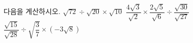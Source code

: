 다음을 계산하시오.
 $\sqrt{72}\div\sqrt{20}\times\sqrt{10}$
 $\dfrac{4\sqrt{3}}{\sqrt{2}}\times\dfrac{2\sqrt{5}}{\sqrt{6}}\div\dfrac{\sqrt{30}}{\sqrt{27}}$
 $\dfrac{\sqrt{15}}{\sqrt{28}}\div\sqrt{\dfrac{3}{7}}\times(-3\sqrt{8})$
